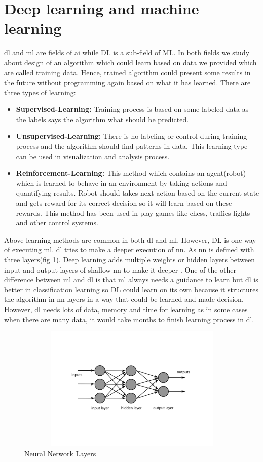 \section{Deep learning and machine learning} \label{ML}
\acrfull{dl} and \acrfull{ml} are fields of \acrfull{ai} while DL is a sub-field of ML. In both fields we study about design of an algorithm which could learn based on data we provided which are called training data. Hence, trained algorithm could present some results in the future without programming again based on what it has learned. There are three types of learning:\cite{AI}
\begin{itemize}
    \item \textbf{Supervised-Learning:} Training process is based on some labeled data as the labels says the algorithm what should be predicted.
    \item \textbf{Unsupervised-Learning:} There is no labeling or control during training process and the algorithm should find patterns in data. This learning type can be used in visualization and analysis process.
    \item \textbf{Reinforcement-Learning:} This method which contains an agent(robot) which is learned to behave in an environment by taking actions and quantifying results. Robot should takes next action based on the current state and gets reward for its correct decision so it will learn based on these rewards. This method has been used in play games like chess, traffics lights and other control systems.
\end{itemize}
Above learning methods are common in both \acrshort{dl} and \acrshort{ml}. However, DL is one way of executing \acrshort{ml}. \acrshort{dl} tries to make a deeper execution of \acrfull{nn}. As \acrshort{nn} is defined with three layers(fig \ref{fig:NN}). Deep learning adds multiple weights or hidden layers between input and output layers of shallow \acrshort{nn} to make it deeper \cite{AI}. One of the other difference between \acrshort{ml} and \acrshort{dl} is that \acrshort{ml} always needs a guidance to learn but \acrshort{dl} is better in classification learning so DL could learn on its own because it structures the algorithm in \acrshort{nn} layers in a way that could be learned and made decision. However, \acrshort{dl} needs lots of data, memory and time for learning as in some cases when there are many data, it would take months to finish learning process in \acrlong{dl}.
\begin{figure}
    \centering
    \includegraphics[width=12cm, height=6cm]{images/NN.pdf}
    \caption{Neural Network Layers}
    \label{fig:NN}
\end{figure}
